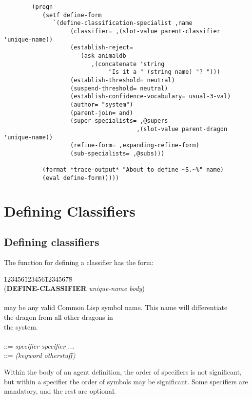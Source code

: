\begin{verbatim}
        (progn 
           (setf define-form
              `(define-classification-specialist ,name
                   (classifier= ,(slot-value parent-classifier 'unique-name))
                   (establish-reject=
                      (ask animaldb
                         ,(concatenate 'string
                              "Is it a " (string name) "? ")))
                   (establish-threshold= neutral)
                   (suspend-threshold= neutral)
                   (establish-confidence-vocabulary= usual-3-val)
                   (author= "system")
                   (parent-join= and)
                   (super-specialists= ,@supers 
                                      ,(slot-value parent-dragon 'unique-name))
                   (refine-form= ,expanding-refine-form)
                   (sub-specialists= ,@subs)))

           (format *trace-output* "About to define ~S.~%" name)
           (eval define-form)))))
\end{verbatim}



\chapter{Defining Classifiers\label{classifiers}}

\section{Defining classifiers}

The function for defining a classifier has the form:

\begin{tabbing}
123456\=123456\=12345678\= \kill
\\
\>({\bf DEFINE-CLASSIFIER} {\it unique-name  body}) \\
\\
\> may be any valid Common Lisp symbol name. This
name will differentiate\\
\>\>\>the dragon from all other dragons in \\
\>\>\>the system. \\
\\
\> \>::= {\it specifier specifier ...} \\
\>\> ::= {\it (keyword otherstuff)}
\\
\end{tabbing}
Within the body of an agent definition, the order of specifiers is not
significant, but within a specifier the order of symbols may be significant.
Some specifiers are mandatory, and the rest are optional.

